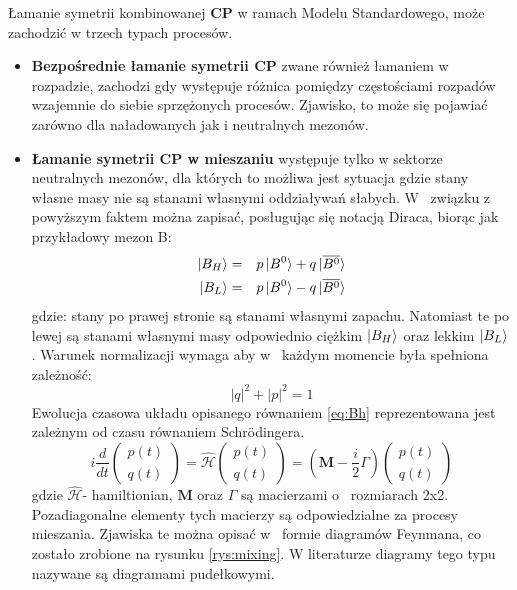 Łamanie symetrii kombinowanej \textbf{CP} w ramach Modelu Standardowego, może zachodzić w trzech typach procesów.
\begin{itemize}
\item \textbf{Bezpośrednie łamanie symetrii \textbf{CP}} zwane również łamaniem w rozpadzie, zachodzi gdy występuje różnica pomiędzy częstościami rozpadów wzajemnie do siebie sprzężonych procesów. Zjawisko, to może się pojawiać zarówno dla naładowanych jak i neutralnych mezonów.
\item \textbf{Łamanie symetrii \textbf{CP} w mieszaniu} występuje tylko w sektorze neutralnych mezonów, dla których to możliwa jest sytuacja gdzie stany własne masy nie są stanami własnymi oddziaływań słabych. W~ związku z~ powyższym faktem można zapisać, posługując się notacją Diraca, biorąc jak przykładowy mezon B:
\begin{eqnarray}
\ket{B_H}&=&p\ket{B^0}+q\ket{\overline{B^0}} \\ \nonumber
\ket{B_L}&=&p\ket{B^0}-q\ket{\overline{B^0}} 
\label{eq:Bh}
\end{eqnarray}
gdzie: stany po prawej stronie są stanami własnymi zapachu. Natomiast te po lewej są stanami własnymi masy odpowiednio ciężkim $\ket{B_H}$ oraz lekkim $\ket{B_L}$. Warunek normalizacji wymaga aby w~ każdym momencie była spełniona zależność:
\begin{equation}
|q|^2+|p|^2=1
\label{eq:normalizacja}
\end{equation}
Ewolucja czasowa układu opisanego równaniem \ref{eq:Bh} reprezentowana jest zależnym od czasu równaniem Schrödingera. 
\begin{equation}
i\frac{d}{dt} \begin{pmatrix} p(t) \\ q(t)
\end{pmatrix}=\hat{\mathcal{H}} \begin{pmatrix} p(t) \\ q(t)
\end{pmatrix}=(\textbf{M}-\frac{i}{2}\Gamma) \begin{pmatrix} p(t) \\ q(t)
\end{pmatrix}
\label{Erwin}
\end{equation}
gdzie $\hat{\mathcal{H}}$- hamiltionian, $\textbf{M}$ oraz $\Gamma$ są macierzami o~ rozmiarach 2x2. Pozadiagonalne elementy tych macierzy są odpowiedzialne za procesy mieszania. Zjawiska te można opisać  w~ formie diagramów Feynmana, co zostało zrobione na rysunku \ref{rys:mixing}. W literaturze diagramy tego typu nazywane są diagramami pudełkowymi. 


\end{itemize}
